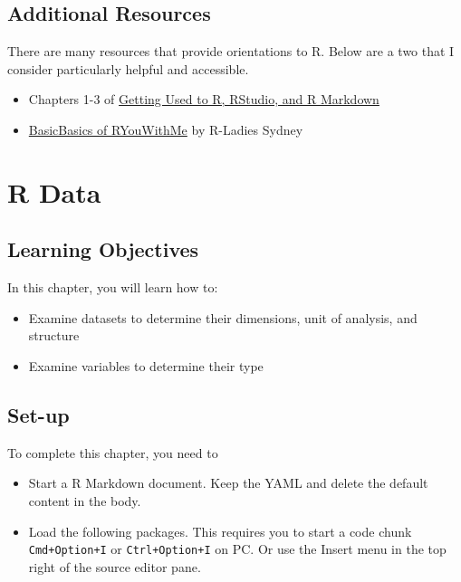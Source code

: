 \documentclass[
]{book}
\providecommand{\tightlist}{%
  \setlength{\itemsep}{0pt}\setlength{\parskip}{0pt}}
\begin{document}
\hypertarget{additional-resources}{%
\section{Additional Resources}\label{additional-resources}}

There are many resources that provide orientations to R. Below are a two that I consider particularly helpful and accessible.

\begin{itemize}
\tightlist
\item
  Chapters 1-3 of \href{https://rbasics.netlify.app/index.html}{Getting Used to R, RStudio, and R Markdown}
\item
  \href{https://rladiessydney.org/courses/ryouwithme/01-basicbasics-0/}{BasicBasics of RYouWithMe} by R-Ladies Sydney
\end{itemize}

\hypertarget{r-data}{%
\chapter{R Data}\label{r-data}}

\hypertarget{learning-objectives}{%
\section{Learning Objectives}\label{learning-objectives}}

In this chapter, you will learn how to:

\begin{itemize}
\tightlist
\item
  Examine datasets to determine their dimensions, unit of analysis, and structure
\item
  Examine variables to determine their type
\end{itemize}

\hypertarget{set-up}{%
\section{Set-up}\label{set-up}}

To complete this chapter, you need to

\begin{itemize}
\tightlist
\item
  Start a R Markdown document. Keep the YAML and delete the default content in the body.
\item
  Load the following packages. This requires you to start a code chunk \texttt{Cmd+Option+I} or \texttt{Ctrl+Option+I} on PC. Or use the Insert menu in the top right of the source editor pane.
\end{itemize}
\end{document}
